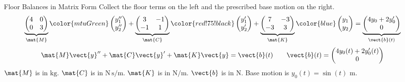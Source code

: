 \documentclass[11pt,aspectratio=169]{beamer}
\begin{document}
\begin{frame}{Floor Balances in Matrix Form}
Collect the floor terms on the left and the prescribed base motion on the right.
\[
  \underbrace{\begin{pmatrix}4&0\\0&3\end{pmatrix}}_{\mat{M}}
    {\color{mtuGreen}\begin{pmatrix}y_1''\\y_2''\end{pmatrix}}
  +\underbrace{\begin{pmatrix}3&-1\\-1&1\end{pmatrix}}_{\mat{C}}
    {\color{red!75!black}\begin{pmatrix}y_1'\\y_2'\end{pmatrix}}
  +\underbrace{\begin{pmatrix}7&-3\\-3&3\end{pmatrix}}_{\mat{K}}
    {\color{blue}\begin{pmatrix}y_1\\y_2\end{pmatrix}}
  =\underbrace{\begin{pmatrix}4y_0+2y_0'\\0\end{pmatrix}}_{\vect{b}(t)}
\]
\[
  \mat{M}\vect{y}''+\mat{C}\vect{y}'+\mat{K}\vect{y}=\vect{b}(t)
  \qquad
  \vect{b}(t)=\begin{pmatrix}4y_0(t)+2y_0'(t)\\0\end{pmatrix}
\]
$\mat{M}$ is in $\mathrm{kg}$.
$\mat{C}$ is in $\mathrm{N\,s/m}$.
$\mat{K}$ is in $\mathrm{N/m}$.
$\vect{b}$ is in $\mathrm{N}$.
Base motion is $y_0(t)=\sin(t)$ $\mathrm{m}$.
\end{frame}
\end{document}
